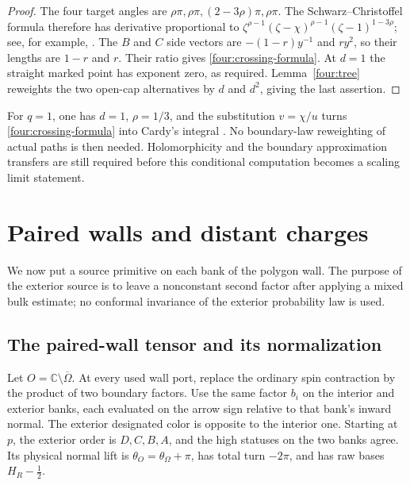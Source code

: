 \begin{proof}
The four target angles are
$\rho\pi,\rho\pi,(2-3\rho)\pi,\rho\pi$.  The
Schwarz--Christoffel formula therefore has derivative proportional to
$\zeta^{\rho-1}(\zeta-\chi)^{\rho-1}(\zeta-1)^{1-3\rho}$;
see, for example, \cite{Pommerenke1992}.  The $B$ and $C$ side vectors
are $-(1-r)y^{-1}$ and $ry^2$, so their lengths are $1-r$ and $r$.
Their ratio gives \eqref{four:crossing-formula}.  At $d=1$ the straight
marked point has exponent zero, as required.  Lemma~\ref{four:tree}
reweights the two open-cap alternatives by $d$ and $d^2$, giving the
last assertion.
\end{proof}

For $q=1$, one has $d=1$, $\rho=1/3$, and the substitution $v=\chi/u$
turns \eqref{four:crossing-formula} into Cardy's integral
\cite{Cardy1992}.  No boundary-law reweighting of actual paths is then
needed.  Holomorphicity and the boundary approximation transfers are
still required before this conditional computation becomes a scaling
limit statement.

\section{Paired walls and distant charges}
\label{sec:pairedwall}

We now put a source primitive on each bank of the polygon wall.  The
purpose of the exterior source is to leave a nonconstant second factor
after applying a mixed bulk estimate; no conformal invariance of the
exterior probability law is used.

\subsection{The paired-wall tensor and its normalization}

Let $O=\mathbb C\setminus\overline\Omega$.  At every used wall port,
replace the ordinary spin contraction by the product of two boundary
factors.  Use the same factor $b_i$ on the interior and exterior banks,
each evaluated on the arrow sign relative to that bank's inward normal.
The exterior designated color is opposite to the interior one.
Starting at $p$, the exterior order is $D,C,B,A$, and the high statuses
on the two banks agree.  Its physical normal lift is
$\theta_O=\theta_\Omega+\pi$, has total turn $-2\pi$, and has raw
bases $H_R-\tfrac12$.

